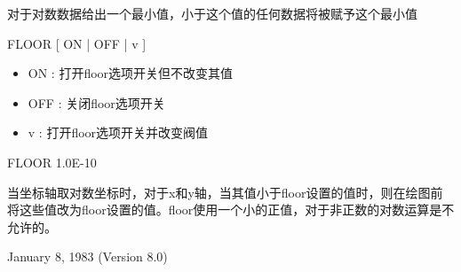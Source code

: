 \label{cmd:floor}

对于对数数据给出一个最小值，小于这个值的任何数据将被赋予这个最小值

FLOOR   [ ON | OFF | v ]

\begin{itemize}
\item ON : 打开floor选项开关但不改变其值
\item OFF : 关闭floor选项开关
\item v : 打开floor选项开关并改变阀值
\end{itemize}

FLOOR 1.0E-10

当坐标轴取对数坐标时，对于x和y轴，当其值小于floor设置的值时，则在绘图前将这些值改为floor设置的值。floor使用一个小的正值，对于非正数的对数运算是不允许的。

January 8, 1983 (Version 8.0)
